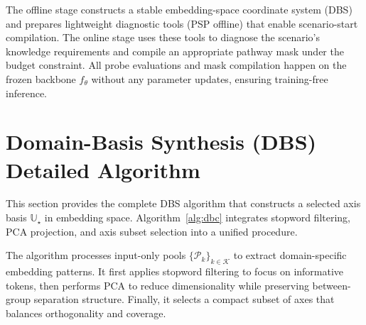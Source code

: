 The offline stage constructs a stable embedding-space coordinate system (DBS) and prepares lightweight diagnostic tools (PSP offline) that enable scenario-start compilation.
The online stage uses these tools to diagnose the scenario's knowledge requirements and compile an appropriate pathway mask under the budget constraint.
All probe evaluations and mask compilation happen on the frozen backbone $f_\theta$ without any parameter updates, ensuring training-free inference.


\section{Domain-Basis Synthesis (DBS) Detailed Algorithm}
\label{app:dbc_details}

This section provides the complete DBS algorithm that constructs a selected axis basis $\mathbb{U}_\star$ in embedding space.
Algorithm~\ref{alg:dbc} integrates stopword filtering, PCA projection, and axis subset selection into a unified procedure.

The algorithm processes input-only pools $\{\mathcal{P}_k\}_{k\in\mathcal{K}}$ to extract domain-specific embedding patterns.
It first applies stopword filtering to focus on informative tokens, then performs PCA to reduce dimensionality while preserving between-group separation structure.
Finally, it selects a compact subset of axes that balances orthogonality and coverage.

